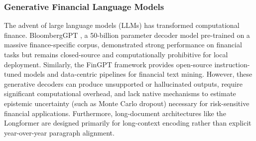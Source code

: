 \documentclass[journal]{IEEEtran}
\begin{document}
\subsubsection{Generative Financial Language Models}
The advent of large language models (LLMs) has transformed computational finance. BloombergGPT \cite{wu2023bloomberggpt}, a 50-billion parameter decoder model pre-trained on a massive finance-specific corpus, demonstrated strong performance on financial tasks but remains closed-source and computationally prohibitive for local deployment. Similarly, the FinGPT framework \cite{yang2023fingpt, li2023fingpt} provides open-source instruction-tuned models and data-centric pipelines for financial text mining. However, these generative decoders can produce unsupported or hallucinated outputs, require significant computational overhead, and lack native mechanisms to estimate epistemic uncertainty (such as Monte Carlo dropout) necessary for risk-sensitive financial applications. Furthermore, long-document architectures like the Longformer \cite{beltagy2020longformer} are designed primarily for long-context encoding rather than explicit year-over-year paragraph alignment.
\end{document}
